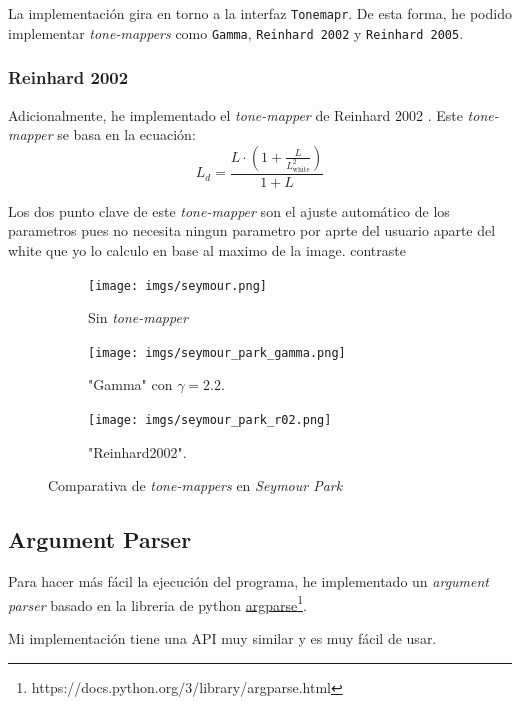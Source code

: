 \documentclass{article}
\begin{document}
La implementación gira en torno a la interfaz \texttt{Tonemapr}. De esta forma,
he podido implementar \textit{tone-mappers} como \texttt{Gamma}, \texttt{Reinhard
  2002} y \texttt{Reinhard 2005}.

\subsubsection{Reinhard 2002}
Adicionalmente, he implementado el \textit{tone-mapper} de Reinhard 2002 \cite{Reinhard2002}.
Este \textit{tone-mapper} se basa en la ecuación:
\begin{equation}
  L_d = \frac{L \cdot (1 + \frac{L}{L_{\text{white}}^2})}{1 + L}
\end{equation}

Los dos punto clave de este \textit{tone-mapper} son el ajuste automático de los parametros
pues no necesita ningun parametro por aprte del usuario aparte del white que yo lo calculo en base 
al maximo de la image.
contraste

\begin{figure}[H]
  \begin{subfigure}[h]{0.32\linewidth}
    \texttt{[image: imgs/seymour.png]}
    \caption{Sin \textit{tone-mapper}}
  \end{subfigure}
  \hfill
  \begin{subfigure}[h]{0.32\linewidth}
    \texttt{[image: imgs/seymour\_park\_gamma.png]}
    \caption{"Gamma" con \(\gamma=2.2\).}
  \end{subfigure}
  \hfill
  \begin{subfigure}[h]{0.32\linewidth}
    \texttt{[image: imgs/seymour\_park\_r02.png]}
    \caption{"Reinhard2002".}
  \end{subfigure}
  \caption{Comparativa de \textit{tone-mappers} en \textit{Seymour Park}}
\end{figure}

\subsection{Argument Parser}
Para hacer más fácil la ejecución del programa, he implementado un \textit{argument
parser} basado en la libreria de python
\href{https://docs.python.org/3/library/argparse.html}{argparse}\footnote{https://docs.python.org/3/library/argparse.html}.

Mi implementación tiene una API muy similar y es muy fácil de usar.
\end{document}
